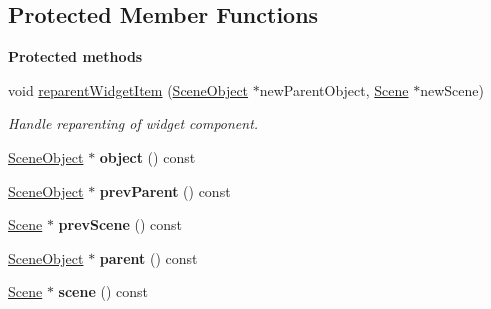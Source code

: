 \subsection*{Protected Member Functions}
\begin{Indent}\textbf{ Protected methods}\par
\begin{DoxyCompactItemize}
\item 
\mbox{\label{classrev_1_1_reparent_scene_object_command_a729acee650c3be11ff321e9ae4dcc33e}} 
void \mbox{\hyperlink{classrev_1_1_reparent_scene_object_command_a729acee650c3be11ff321e9ae4dcc33e}{reparent\+Widget\+Item}} (\mbox{\hyperlink{classrev_1_1_scene_object}{Scene\+Object}} $\ast$new\+Parent\+Object, \mbox{\hyperlink{classrev_1_1_scene}{Scene}} $\ast$new\+Scene)
\begin{DoxyCompactList}\small\item\em Handle reparenting of widget component. \end{DoxyCompactList}\item 
\mbox{\label{classrev_1_1_reparent_scene_object_command_a00e912368e97fa0479fb485054344be6}} 
\mbox{\hyperlink{classrev_1_1_scene_object}{Scene\+Object}} $\ast$ {\bfseries object} () const
\item 
\mbox{\label{classrev_1_1_reparent_scene_object_command_a348fa1be8b231400c441dd49b966fab8}} 
\mbox{\hyperlink{classrev_1_1_scene_object}{Scene\+Object}} $\ast$ {\bfseries prev\+Parent} () const
\item 
\mbox{\label{classrev_1_1_reparent_scene_object_command_ae35e7a1f554523762ae980d545d87d74}} 
\mbox{\hyperlink{classrev_1_1_scene}{Scene}} $\ast$ {\bfseries prev\+Scene} () const
\item 
\mbox{\label{classrev_1_1_reparent_scene_object_command_adaea16faa90de9c33cab09e7fc743de6}} 
\mbox{\hyperlink{classrev_1_1_scene_object}{Scene\+Object}} $\ast$ {\bfseries parent} () const
\item 
\mbox{\label{classrev_1_1_reparent_scene_object_command_a1ea840031ed675f2a04d27814b94f463}} 
\mbox{\hyperlink{classrev_1_1_scene}{Scene}} $\ast$ {\bfseries scene} () const
\end{DoxyCompactItemize}
\end{Indent}
